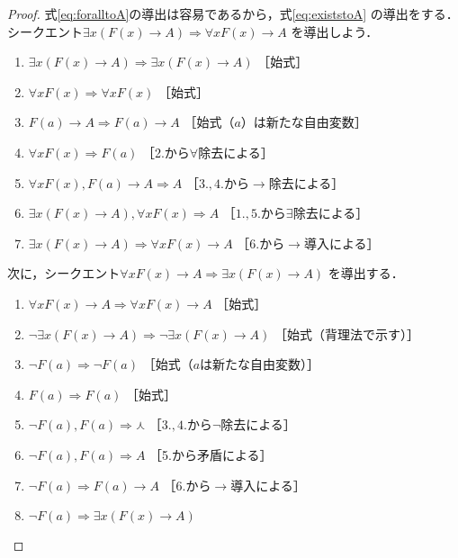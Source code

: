    \begin{proof}
     式\eqref{eq:foralltoA}の導出は容易であるから，式\eqref{eq:existstoA}
     の導出をする．
     シークエント$\exists x (F(x) \to A ) \Longrightarrow \forall x F(x) \to A$
     を導出しよう．
     \begin{enumerate}[1. ]
       \item $\exists x (F(x) \to A ) \Longrightarrow \exists x (F(x) \to A)$
              \quad ［始式］
       \item $\forall x F(x) \Longrightarrow \forall x F(x)$ \quad ［始式］
       \item $F(a) \to A \Longrightarrow F(a) \to A $ \quad ［始式（$a$）は新たな自由変数］
       \item $\forall x F(x) \Longrightarrow F(a)$ \quad ［2.から$\forall$除去による］
       \item $\forall x F(x) ,  F(a) \to A \Longrightarrow A$
              \quad ［$3., 4.$から$\to$除去による］
       \item $\exists x (F(x) \to A) ,  \forall x F(x) \Longrightarrow A$
              \quad ［$1., 5.$から$\exists$除去による］
       \item $\exists x (F(x) \to A) \Longrightarrow \forall x F(x) \to A$
              \quad ［6.から$\to$導入による］
     \end{enumerate}
     次に，シークエント$\forall x F(x) \to A \Longrightarrow \exists x (F(x) \to A)$
     を導出する．
     \begin{enumerate}[1. ]
       \item $\forall x F(x) \to A \Longrightarrow \forall x F(x) \to A $
              \quad ［始式］
       \item $\lnot \exists x (F(x) \to A) \Longrightarrow \lnot \exists x (F(x) \to A)$
              \quad ［始式（背理法で示す）］
       \item $\lnot F(a) \Longrightarrow \lnot F(a)$ \quad ［始式（$a$は新たな自由変数）］
       \item $F(a) \Longrightarrow F(a)$ \quad ［始式］
       \item $\lnot F(a) ,  F(a) \Longrightarrow \curlywedge$
              \quad ［$3., 4.$から$\lnot$除去による］
       \item $\lnot F(a) ,  F(a) \Longrightarrow A$ \quad ［5.から矛盾による］
       \item $\lnot F(a) \Longrightarrow F(a) \to A$ \quad ［6.から$\to$導入による］
       \item $\lnot F(a) \Longrightarrow \exists x (F(x) \to A)$

\end{enumerate}
\end{proof}
